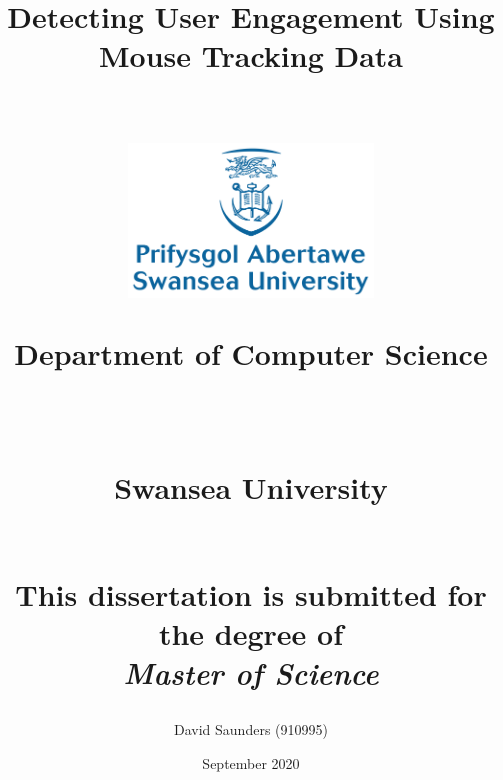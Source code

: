 



\newcommand{\horrule}[1]{\rule{\linewidth}{#1}} %
\title{
\begin{Huge}\textbf{Detecting User Engagement Using Mouse Tracking Data} \end{Huge} \\%
\vspace{70px}
\includegraphics[width = 65mm]{Images/SwanseaUniversity}\\[8ex]
\vspace{10px}
\normalfont \normalsize 
\begin{normalsize}Department of Computer Science \end{normalsize}\\  %
\begin{normalsize} Swansea University \end{normalsize} \\ %
\vspace{60px}
This dissertation is submitted for the degree of\\
\textit{Master of Science}
\vspace{20px}
}
\author{David Saunders (910995)} %
\date{September 2020} %
\newpage
